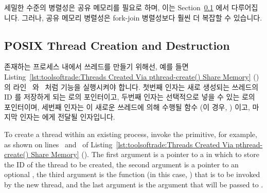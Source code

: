 세밀한 수준의 병렬성은 공유 메모리를 필요로 하며, 이는
Section~\ref{sec:toolsoftrade:POSIX Thread Creation and Destruction}
에서 다루어집니다.
그러나, 공유 메모리 병렬성은 fork-join 병렬성보다 훨씬 더 복잡할 수 있습니다.

\subsection{POSIX Thread Creation and Destruction}
\label{sec:toolsoftrade:POSIX Thread Creation and Destruction}

\begin{fcvref}
존재하는 프로세스 내에서 쓰레드를 만들기 위해선, 예를 들면
Listing~\ref{lst:toolsoftrade:Threads Created Via pthread-create() Share Memory}
()
의 라인~ 와~ 처럼 
기능을 실행시켜야 합니다.
첫번째 인자는 새로 생성되는 쓰레드의 ID 를 저장하게 되는  로의
포인터이고, 두번째  인자는 선택적으로 넣을 수 있는 
로의 포인터이며, 세번째 인자는 이 새로운 쓰레드에 의해 수행될 함수 (이 경우,
) 이고, 마지막  인자는  에게 전달될
인자입니다.
\end{fcvref}

\iffalse

\begin{fcvref}
To create a thread within an existing process, invoke the
 primitive, for example, as shown on
lines~ and~ of
Listing~\ref{lst:toolsoftrade:Threads Created Via pthread-create() Share Memory}
().
The first argument is a pointer to a  in which to store the
ID of the thread to be created, the second  argument is a pointer
to an optional , the third argument is the function
(in this case, )
that is to be invoked by the new thread, and the last  argument
is the argument that will be passed to .
\end{fcvref}

